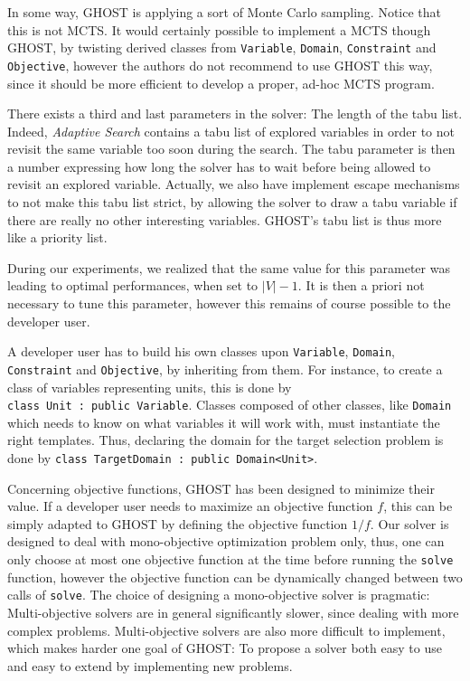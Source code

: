 \documentclass{article}
\newcommand{\ghost}{\textsc{GHOST}\xspace}
\begin{document}
In some way, \ghost is applying a sort of Monte Carlo sampling. Notice
that this  is not MCTS.   It would  certainly possible to  implement a
MCTS    though   \ghost,    by   twisting    derived   classes    from
\texttt{Variable},     \texttt{Domain},    \texttt{Constraint}     and
\texttt{Objective}, however the authors do not recommend to use \ghost
this  way, since  it should  be more  efficient to  develop a  proper,
ad-hoc MCTS program.

There exists a third and last  parameters in the solver: The length of
the tabu list.  Indeed, {\it Adaptive  Search} contains a tabu list of
explored variables in order to not  revisit the same variable too soon
during the search. The tabu parameter  is then a number expressing how
long  the solver  has  to  wait before  being  allowed  to revisit  an
explored variable. Actually, we  also have implement escape mechanisms
to not make  this tabu list strict,  by allowing the solver  to draw a
tabu   variable   if   there   are   really   no   other   interesting
variables. \ghost's tabu list is thus more like a priority list.

During  our experiments,  we realized  that  the same  value for  this
parameter was  leading to optimal  performances, when set  to $|V|-1$.
It is then a priori not necessary to tune this parameter, however this
remains of course possible to the developer user.

A developer user has to  build his own classes upon \texttt{Variable},
\texttt{Domain},   \texttt{Constraint}   and  \texttt{Objective},   by
inheriting from  them. For  instance, to create  a class  of variables
representing        units,        this        is        done        by
\texttt{class~Unit~:~public~Variable}.   Classes   composed  of  other
classes, like \texttt{Domain} which needs to know on what variables it
will work with, must instantiate  the right templates. Thus, declaring
the   domain   for  the   target   selection   problem  is   done   by
\texttt{class~TargetDomain~:~public~Domain<Unit>}.

Concerning objective  functions, \ghost has been  designed to minimize
their  value.  If  a developer  user  needs to  maximize an  objective
function $f$,  this can be  simply adapted  to \ghost by  defining the
objective  function  $1/f$.   Our  solver is  designed  to  deal  with
mono-objective optimization problem only, thus, one can only choose at
most  one   objective  function  at   the  time  before   running  the
\texttt{solve}  function,  however  the   objective  function  can  be
dynamically changed between two calls of \texttt{solve}. The choice of
designing  a  mono-objective   solver  is  pragmatic:  Multi-objective
solvers are in  general significantly slower, since  dealing with more
complex problems.  Multi-objective solvers  are also more difficult to
implement, which makes harder one goal  of \ghost: To propose a solver
both easy to use and easy to extend by implementing new problems.
\end{document}
